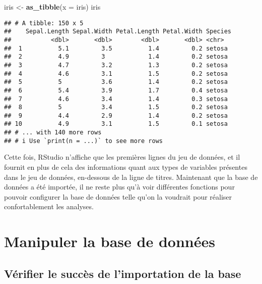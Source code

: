 \documentclass[
  french,
]{book}
\newenvironment{Shaded}{\begin{snugshade}}{\end{snugshade}}
\newcommand{\DataTypeTok}[1]{\textcolor[rgb]{0.13,0.29,0.53}{#1}}
\newcommand{\KeywordTok}[1]{\textcolor[rgb]{0.13,0.29,0.53}{\textbf{#1}}}
\newcommand{\NormalTok}[1]{#1}
\newcommand{\StringTok}[1]{\textcolor[rgb]{0.31,0.60,0.02}{#1}}
\begin{document}
\begin{Shaded}
\begin{Highlighting}[]
\NormalTok{iris <-}\StringTok{ }\KeywordTok{as_tibble}\NormalTok{(}\DataTypeTok{x =}\NormalTok{ iris)}
\NormalTok{iris}
\end{Highlighting}
\end{Shaded}

\begin{verbatim}
## # A tibble: 150 x 5
##    Sepal.Length Sepal.Width Petal.Length Petal.Width Species
##           <dbl>       <dbl>        <dbl>       <dbl> <chr>  
##  1          5.1         3.5          1.4         0.2 setosa 
##  2          4.9         3            1.4         0.2 setosa 
##  3          4.7         3.2          1.3         0.2 setosa 
##  4          4.6         3.1          1.5         0.2 setosa 
##  5          5           3.6          1.4         0.2 setosa 
##  6          5.4         3.9          1.7         0.4 setosa 
##  7          4.6         3.4          1.4         0.3 setosa 
##  8          5           3.4          1.5         0.2 setosa 
##  9          4.4         2.9          1.4         0.2 setosa 
## 10          4.9         3.1          1.5         0.1 setosa 
## # ... with 140 more rows
## # i Use `print(n = ...)` to see more rows
\end{verbatim}

Cette fois, RStudio n'affiche que les premières lignes du jeu de données, et il fournit en plus de cela des informations quant aux types de variables présentes dans le jeu de données, en-dessous de la ligne de titres. Maintenant que la base de données a été importée, il ne reste plus qu'à voir différentes fonctions pour pouvoir configurer la base de données telle qu'on la voudrait pour réaliser confortablement les analyses.

\hypertarget{manipuler-la-base-de-donnuxe9es}{%
\section{Manipuler la base de données}\label{manipuler-la-base-de-donnuxe9es}}

\hypertarget{vuxe9rifier-le-succuxe8s-de-limportation-de-la-base}{%
\subsection{Vérifier le succès de l'importation de la base}\label{vuxe9rifier-le-succuxe8s-de-limportation-de-la-base}}
\end{document}
